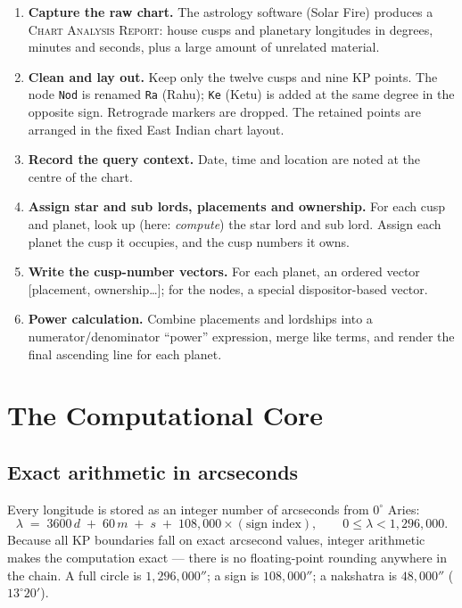 \documentclass[11pt, a4paper]{article}
\newcommand{\code}[1]{\texttt{#1}}
\begin{document}
\begin{enumerate}[leftmargin=1.4em]
  \item \textbf{Capture the raw chart.} The astrology software (Solar Fire)
    produces a \textsc{Chart Analysis Report}: house cusps and planetary
    longitudes in degrees, minutes and seconds, plus a large amount of
    unrelated material.
  \item \textbf{Clean and lay out.} Keep only the twelve cusps and nine KP
    points. The node \code{Nod} is renamed \code{Ra} (Rahu); \code{Ke} (Ketu)
    is added at the same degree in the opposite sign. Retrograde markers are
    dropped. The retained points are arranged in the fixed East Indian chart
    layout.
  \item \textbf{Record the query context.} Date, time and location are noted
    at the centre of the chart.
  \item \textbf{Assign star and sub lords, placements and ownership.} For each
    cusp and planet, look up (here: \emph{compute}) the star lord and sub lord.
    Assign each planet the cusp it occupies, and the cusp numbers it owns.
  \item \textbf{Write the cusp-number vectors.} For each planet, an ordered
    vector [placement, ownership\ldots]; for the nodes, a special
    dispositor-based vector.
  \item \textbf{Power calculation.} Combine placements and lordships into a
    numerator/denominator ``power'' expression, merge like terms, and render
    the final ascending line for each planet.
\end{enumerate}

\section{The Computational Core}

\subsection{Exact arithmetic in arcseconds}

Every longitude is stored as an integer number of arcseconds from
$0^\circ$ Aries:
\[
  \lambda \;=\; 3600\,d \;+\; 60\,m \;+\; s \;+\; 108{,}000 \times (\text{sign index}),
  \qquad 0 \le \lambda < 1{,}296{,}000.
\]
Because all KP boundaries fall on exact arcsecond values, integer arithmetic
makes the computation exact --- there is no floating-point rounding anywhere in
the chain. A full circle is $1{,}296{,}000''$; a sign is $108{,}000''$; a
nakshatra is $48{,}000''$ ($13^\circ20'$).
\end{document}

